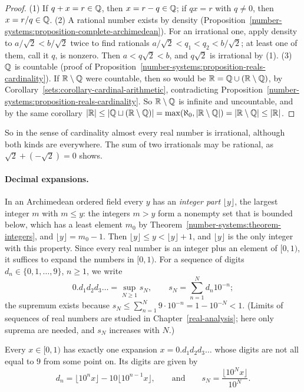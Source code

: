 \begin{proof}
(1) If $q + x = r \in \mathbb{Q}$, then $x = r - q \in \mathbb{Q}$; if $qx = r$ with $q \neq 0$, then $x = r/q \in \mathbb{Q}$.
(2) A rational number exists by density (Proposition~\ref{number-systems:proposition-complete-archimedean}). For an irrational one, apply density to $a/\sqrt 2 < b/\sqrt 2$ twice to find rationals
$a/\sqrt 2 < q_1 < q_2 < b/\sqrt 2$; at least one of them, call it $q$, is nonzero. Then $a < q\sqrt 2 < b$, and $q\sqrt 2$ is irrational by (1).
(3) $\mathbb{Q}$ is countable (proof of Proposition~\ref{number-systems:proposition-reals-cardinality}). If $\mathbb{R} \setminus \mathbb{Q}$ were countable, then so would be $\mathbb{R} = \mathbb{Q} \cup (\mathbb{R} \setminus \mathbb{Q})$, by
Corollary~\ref{sets:corollary-cardinal-arithmetic}, contradicting Proposition~\ref{number-systems:proposition-reals-cardinality}. So $\mathbb{R} \setminus \mathbb{Q}$ is infinite and uncountable, and by the same corollary
$|\mathbb{R}| \leq |\mathbb{Q} \sqcup (\mathbb{R} \setminus \mathbb{Q})| = \max(\aleph_0, |\mathbb{R} \setminus \mathbb{Q}|) = |\mathbb{R} \setminus \mathbb{Q}| \leq |\mathbb{R}|$.
\end{proof}

So in the sense of cardinality almost every real number is irrational, although both kinds are everywhere. The sum of two irrationals may be rational, as $\sqrt 2 + (-\sqrt 2) = 0$ shows.

\paragraph{Decimal expansions.} In an Archimedean ordered field every $y$ has an \emph{integer part} $\lfloor y\rfloor$, the largest integer $m$ with $m \leq y$: the integers $m > y$ form a nonempty set that is
bounded below, which has a least element $m_0$ by Theorem~\ref{number-systems:theorem-integers}, and $\lfloor y\rfloor = m_0 - 1$. Then $\lfloor y\rfloor \leq y < \lfloor y\rfloor + 1$, and $\lfloor y\rfloor$ is the only
integer with this property. Since every real number is an integer plus an element of $[0, 1)$, it suffices to expand the numbers in $[0, 1)$. For a sequence of digits $d_n \in \{0, 1, \ldots, 9\}$, $n \geq 1$,
we write
\[
0.d_1d_2d_3\ldots = \sup_{N \geq 1}s_N, \qquad s_N = \sum_{n=1}^Nd_n10^{-n};
\]
the supremum exists because $s_N \leq \sum_{n=1}^N9 \cdot 10^{-n} = 1 - 10^{-N} < 1$. (Limits of sequences of real numbers are studied in Chapter~\ref{real-analysis}; here only suprema are needed, and
$s_N$ increases with $N$.)

\begin{theorem}\label{number-systems:theorem-decimals}
Every $x \in [0, 1)$ has exactly one expansion $x = 0.d_1d_2d_3\ldots$ whose digits are not all equal to $9$ from some point on. Its digits are given by
\[
d_n = \lfloor 10^nx\rfloor - 10\lfloor 10^{n-1}x\rfloor, \qquad\text{and}\qquad s_N = \frac{\lfloor 10^Nx\rfloor}{10^N}.
\]
\end{theorem}

